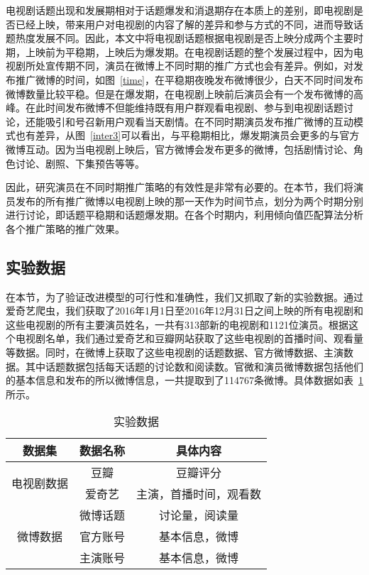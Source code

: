 电视剧话题出现和发展期相对于话题爆发和消退期存在本质上的差别，即电视剧是否已经上映，带来用户对电视剧的内容了解的差异和参与方式的不同，进而导致话题热度发展不同。因此，本文中将电视剧话题根据电视剧是否上映分成两个主要时期，上映前为平稳期，上映后为爆发期。在电视剧话题的整个发展过程中，因为电视剧所处宣传期不同，演员在微博上不同时期的推广方式也会有差异。例如，对发布推广微博的时间，如图~\ref{time}，在平稳期夜晚发布微博很少，白天不同时间发布微博数量比较平稳。但是在爆发期，在电视剧上映前后演员会有一个发布微博的高峰。在此时间发布微博不但能维持既有用户群观看电视剧、参与到电视剧话题讨论，还能吸引和号召新用户观看当天剧情。在不同时期演员发布推广微博的互动模式也有差异，从图~\ref{inter3}可以看出，与平稳期相比，爆发期演员会更多的与官方微博互动。因为当电视剧上映后，官方微博会发布更多的微博，包括剧情讨论、角色讨论、剧照、下集预告等等。

因此，研究演员在不同时期推广策略的有效性是非常有必要的。在本节，我们将演员发布的所有推广微博以电视剧上映的那一天作为时间节点，划分为两个时期分别进行讨论，即话题平稳期和话题爆发期。在各个时期内，利用倾向值匹配算法分析各个推广策略的推广效果。

\subsection{实验数据}

在本节，为了验证改进模型的可行性和准确性，我们又抓取了新的实验数据。通过爱奇艺爬虫，我们获取了2016年1月1日至2016年12月31日之间上映的所有电视剧和这些电视剧的所有主要演员姓名，一共有313部新的电视剧和1121位演员。根据这个电视剧名单，我们通过爱奇艺和豆瓣网站获取了这些电视剧的首播时间、观看量等数据。同时，在微博上获取了这些电视剧的话题数据、官方微博数据、主演数据。其中话题数据包括每天话题的讨论数和阅读数。官微和演员微博数据包括他们的基本信息和发布的所以微博信息，一共提取到了114767条微博。具体数据如表~\ref{data1}所示。

\begin{table}[!htbp]
\centering
\caption{实验数据}
\label{data1}
\begin{tabular}{|c|c|c|} \hline
数据集 & 数据名称 & 具体内容\\ \hline
\multirow{2}{*}{电视剧数据} & 豆瓣 & 豆瓣评分\\%
& 爱奇艺 & 主演，首播时间，观看数\\ \hline
\multirow{3}{*}{微博数据} & 微博话题 & 讨论量，阅读量\\%
& 官方账号 & 基本信息，微博\\%
& 主演账号 & 基本信息，微博\\ \hline
\end{tabular}
\end{table}


